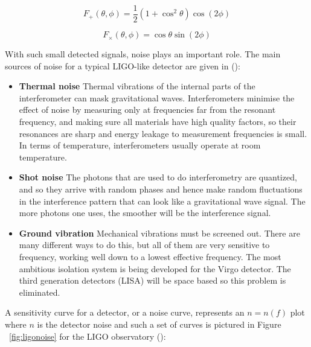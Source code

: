 \documentclass[epsf]{article}
\begin{document}
\begin{equation}
F_+(\theta, \phi) = \frac{1}{2}(1+\cos^2 \theta)\cos(2 \phi)
\end{equation}

\begin{equation}
F_{\times}(\theta, \phi) = \cos \theta \sin(2 \phi)
\end{equation} 

With such small detected signals, noise plays an important role. The main sources of noise for a typical LIGO-like detector are given in (\cite{ligoweb,LIGOIFO,LLOweb,LHOweb,abbott2006,abbott2007,maggiore}):

\begin{itemize}
 \item
   {\bf Thermal noise} Thermal vibrations of the internal parts of the interferometer
can mask gravitational waves. Interferometers minimise the effect of
noise by measuring only at frequencies far from the resonant frequency,
and making sure all materials have high quality factors, so their resonances are sharp
and energy leakage to measurement frequencies is small. In terms of temperature, interferometers usually
operate at room temperature.
 \item
   {\bf Shot noise} The photons that are used to do interferometry are quantized,
and so they arrive with random phases and hence make random
fluctuations in the interference pattern that can look like a gravitational
wave signal. The more photons one uses, the smoother will be the interference
signal.
  \item
  {\bf Ground vibration} Mechanical vibrations must be screened out. There
are many different ways to do this, but all of them are very sensitive to
frequency, working well down to a lowest effective frequency. The most
ambitious isolation system is being developed for the Virgo detector. The third generation detectors (LISA) will
be space based so this problem is eliminated.
\end{itemize}

A sensitivity curve for a detector, or a noise curve, represents an $n=n(f)$ plot where $n$ is the detector noise and such a set of curves is pictured in Figure ~\ref{fig:ligonoise} for the LIGO observatory (\cite{ligoweb,LIGOIFO,abbott2006,abbott2007}):
\end{document}
